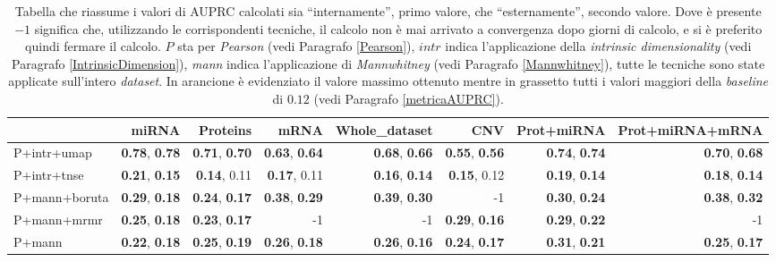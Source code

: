 \documentclass[12pt,italian]{report}
\begin{document}
	\begin{table}[h]
		\begin{center}
			\begin{adjustbox}{max width=\textwidth}
				\begin{tabular}{lrrrrrrr}
					\toprule
					{} &    miRNA &  Proteins &  mRNA &  Whole\_dataset & CNV & Prot+miRNA & Prot+miRNA+mRNA\\
					\midrule
					P+intr+umap & \cellcolor{orange}\textbf{0.78}, \textbf{0.78}& \textbf{0.71}, \textbf{0.70}& \textbf{0.63}, \textbf{0.64}& \textbf{0.68}, \textbf{0.66}&\textbf{0.55}, \textbf{0.56}&\textbf{0.74}, \textbf{0.74} &\textbf{0.70}, \textbf{0.68}  \\
					P+intr+tnse & \textbf{0.21}, \textbf{0.15}& \textbf{0.14}, 0.11 &\textbf{0.17}, 0.11 &\textbf{0.16}, \textbf{0.14}  &\textbf{0.15}, 0.12 & \textbf{0.19}, \textbf{0.14} & \textbf{0.18}, \textbf{0.14} \\
					P+mann+boruta &\textbf{0.29}, \textbf{0.18}  & \textbf{0.24}, \textbf{0.17} & \textbf{0.38}, \textbf{0.29} &\textbf{0.39}, \textbf{0.30} & -1 & \textbf{0.30}, \textbf{0.24} & \textbf{0.38}, \textbf{0.32} \\
					P+mann+mrmr &\textbf{0.25}, \textbf{0.18} & \textbf{0.23}, \textbf{0.17} & -1 & -1 & \textbf{0.29}, \textbf{0.16} & \textbf{0.29}, \textbf{0.22} & -1\\
					P+mann & \textbf{0.22}, \textbf{0.18} & \textbf{0.25}, \textbf{0.19} & \textbf{0.26}, \textbf{0.18} & \textbf{0.26}, \textbf{0.16} & \textbf{0.24}, \textbf{0.17} & \textbf{0.31}, \textbf{0.21} & \textbf{0.25}, \textbf{0.17}\\
					\bottomrule
				\end{tabular}
			\end{adjustbox}
		\end{center}
	\caption{Tabella che riassume i valori di AUPRC calcolati sia ``internamente'', primo valore, che ``esternamente'', secondo valore. Dove è presente $-1$ significa che, utilizzando le corrispondenti tecniche, il calcolo non è mai arrivato a convergenza dopo giorni di calcolo, e si è preferito quindi fermare il calcolo. $P$ sta per \textit{Pearson} (vedi Paragrafo \ref{Pearson}), $intr$ indica l'applicazione della \textit{intrinsic dimensionality}  (vedi Paragrafo \ref{IntrinsicDimension}), \textit{mann} indica l'applicazione di \textit{Mannwhitney} (vedi Paragrafo \ref{Mannwhitney}), tutte le tecniche sono state applicate sull'intero \textit{dataset}. In arancione è evidenziato il valore massimo ottenuto mentre in grassetto tutti i valori maggiori della \textit{baseline} di $0.12$ (vedi Paragrafo \ref{metricaAUPRC}).}
	\label{AUPRC_whole_dataset}
	\end{table}
\end{document}
